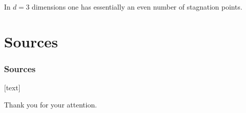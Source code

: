\begin{frame}
  In $d=3$ dimensions one has essentially an even number of stagnation points.
\end{frame}

\section{Sources}

\begin{frame}[allowframebreaks]
	\frametitle{Sources}
	\nocite{*}

	[text]
	\printbibliography
\end{frame}

\begin{frame}[plain]
	\begin{center}
		\Large{{Thank you for your attention.}}
	\end{center}
\end{frame}


